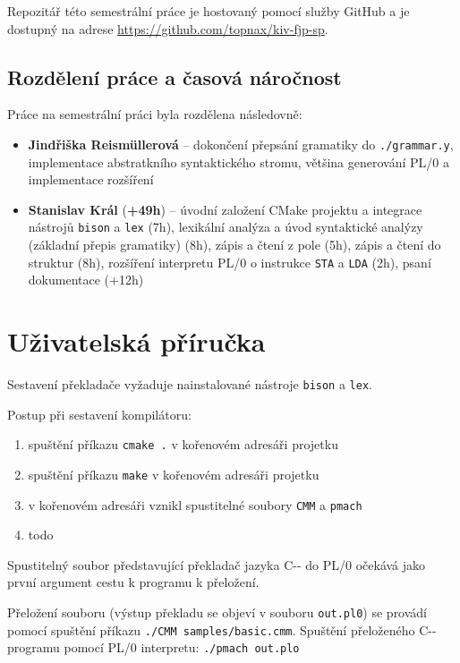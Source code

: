 \documentclass[12pt, a4paper]{article}
\let\oldsection\section
\renewcommand\section{\clearpage\oldsection}
\begin{document}
Repozitář této semestrální práce je hostovaný pomocí služby GitHub a je dostupný na adrese \url{https://github.com/topnax/kiv-fjp-sp}.


\subsection{Rozdělení práce a časová náročnost}
Práce na semestrální práci byla rozdělena následovně:
\begin{itemize}
    \item \textbf{Jindřiška Reismüllerová} -- dokončení přepsání gramatiky do \texttt{./grammar.y}, implementace abstratkního syntaktického stromu, většina generování PL/0 a implementace rozšíření
    \item \textbf{Stanislav Král} (\textbf{+49h}) -- úvodní založení CMake projektu a integrace nástrojů \texttt{bison} a \texttt{lex} (7h), lexikální analýza a úvod syntaktické analýzy (základní přepis gramatiky) (8h), zápis a čtení z pole (5h), zápis a čtení do struktur (8h), rozšíření interpretu PL/0 o instrukce \texttt{STA} a \texttt{LDA} (2h), psaní dokumentace (+12h)
\end{itemize}



\section{Uživatelská příručka}
Sestavení překladače vyžaduje nainstalované nástroje \texttt{bison} a \texttt{lex}.

\newline
\noindent Postup při sestavení kompilátoru:
\begin{enumerate}
    \item spuštění příkazu \texttt{cmake .} v kořenovém adresáři projetku
    \item spuštění příkazu \texttt{make} v kořenovém adresáři projetku
    \item v kořenovém adresáři vznikl spustitelné soubory \texttt{CMM} a \texttt{pmach}
    \item \LARGE todo
\end{enumerate}

Spustitelný soubor představující překladač jazyka C-{}- do PL/0 očekává jako první argument cestu k programu k přeložení.

\newline
Přeložení souboru (výstup překladu se objeví v souboru \texttt{out.pl0}) se provádí pomocí spuštění příkazu \texttt{./CMM samples/basic.cmm}. Spuštění přeloženého C-{}- programu pomocí PL/0 interpretu: \texttt{./pmach out.plo}

    
\end{document}
